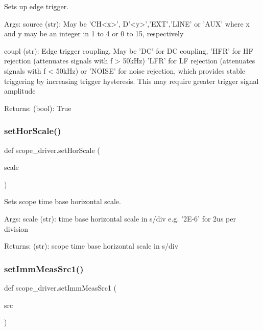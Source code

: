 \begin{DoxyVerb}Sets up edge trigger.

Args:
    source (str): May be 'CH<x>', D'<y>','EXT','LINE' or 'AUX'
        where x and y may be an integer in 1 to 4 or 0 to 15,
        respectively
    
    coupl (str): Edge trigger coupling.
        May be 'DC' for DC coupling,
        'HFR' for HF rejection (attenuates signals with f > 50kHz)
        'LFR' for LF rejection (attenuates signals with f < 50kHz)
        or 'NOISE' for noise rejection, which provides stable
        triggering by increasing trigger hysteresis. This may
        require greater trigger signal amplitude
        
Returns:
    (bool): True
\end{DoxyVerb}
 \mbox{\label{namespacescope__driver_a91febfe7ca6663a9ddb2c384f995582d}} 
\subsubsection{\texorpdfstring{set\+Hor\+Scale()}{setHorScale()}}
{\footnotesize\ttfamily def scope\+\_\+driver.\+set\+Hor\+Scale (\begin{DoxyParamCaption}\item[{}]{scale }\end{DoxyParamCaption})}

\begin{DoxyVerb}Sets scope time base horizontal scale.

Args:
    scale (str): time base horizontal scale in s/div
        e.g. '2E-6' for 2us per division

Returns:
    (str): scope time base horizontal scale in s/div
\end{DoxyVerb}
 \mbox{\label{namespacescope__driver_ae2893de33abe9e87c6dcd578ce086ab3}} 
\subsubsection{\texorpdfstring{set\+Imm\+Meas\+Src1()}{setImmMeasSrc1()}}
{\footnotesize\ttfamily def scope\+\_\+driver.\+set\+Imm\+Meas\+Src1 (\begin{DoxyParamCaption}\item[{}]{src }\end{DoxyParamCaption})}

